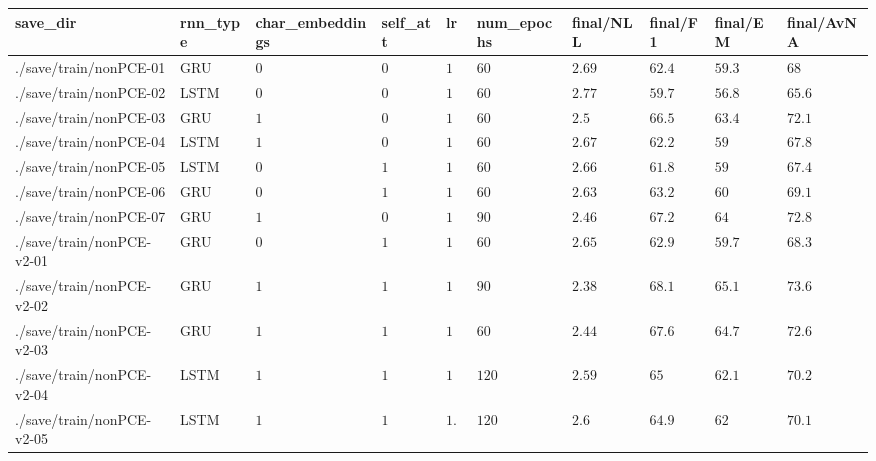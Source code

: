 \begin{table}[tbp]
\begin{tabular}{llllllllll}
save\_dir & rnn\_type & char\_embeddings & self\_att & lr & num\_epochs & final/NLL & final/F1 & final/EM & final/AvNA \\ \hline
./save/train/nonPCE-01 & GRU & $0$ & $0$ & $1$ & $60$ & $2.69$ & $62.4$ & $59.3$ & $68$ \\
./save/train/nonPCE-02 & LSTM & $0$ & $0$ & $1$ & $60$ & $2.77$ & $59.7$ & $56.8$ & $65.6$ \\
./save/train/nonPCE-03 & GRU & $1$ & $0$ & $1$ & $60$ & $2.5$ & $66.5$ & $63.4$ & $72.1$ \\
./save/train/nonPCE-04 & LSTM & $1$ & $0$ & $1$ & $60$ & $2.67$ & $62.2$ & $59$ & $67.8$ \\
./save/train/nonPCE-05 & LSTM & $0$ & $1$ & $1$ & $60$ & $2.66$ & $61.8$ & $59$ & $67.4$ \\
./save/train/nonPCE-06 & GRU & $0$ & $1$ & $1$ & $60$ & $2.63$ & $63.2$ & $60$ & $69.1$ \\
./save/train/nonPCE-07 & GRU & $1$ & $0$ & $1$ & $90$ & $2.46$ & $67.2$ & $64$ & $72.8$ \\
./save/train/nonPCE-v2-01 & GRU & $0$ & $1$ & $1$ & $60$ & $2.65$ & $62.9$ & $59.7$ & $68.3$ \\
./save/train/nonPCE-v2-02 & GRU & $1$ & $1$ & $1$ & $90$ & $2.38$ & $68.1$ & $65.1$ & $73.6$ \\
./save/train/nonPCE-v2-03 & GRU & $1$ & $1$ & $1$ & $60$ & $2.44$ & $67.6$ & $64.7$ & $72.6$ \\
./save/train/nonPCE-v2-04 & LSTM & $1$ & $1$ & $1$ & $120$ & $2.59$ & $65$ & $62.1$ & $70.2$ \\
./save/train/nonPCE-v2-05 & LSTM & $1$ & $1$ & $1.2$ & $120$ & $2.6$ & $64.9$ & $62$ & $70.1$ \\
\hline
\end{tabular}
\end{table}
